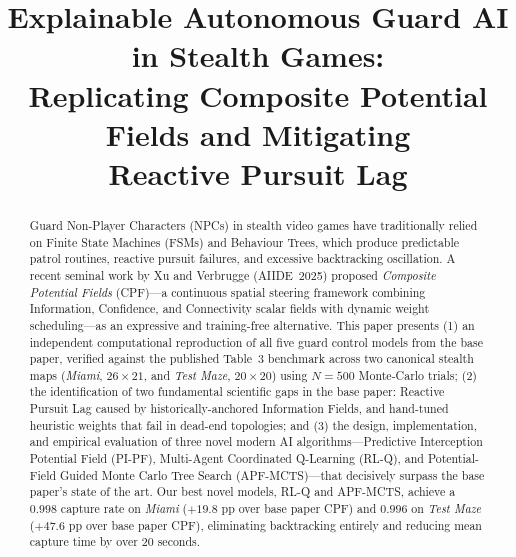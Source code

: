 \documentclass[conference,onecolumn]{IEEEtran}
\begin{document}
\title{Explainable Autonomous Guard AI in Stealth Games:\\
Replicating Composite Potential Fields and Mitigating\\Reactive Pursuit Lag}

\author{
}

\maketitle

\begin{abstract}
Guard Non-Player Characters (NPCs) in stealth video games have
traditionally relied on Finite State Machines (FSMs) and Behaviour
Trees, which produce predictable patrol routines, reactive pursuit
failures, and excessive backtracking oscillation. A recent seminal
work by Xu and Verbrugge (AIIDE~2025) proposed \emph{Composite
Potential Fields} (CPF)---a continuous spatial steering framework
combining Information, Confidence, and Connectivity scalar fields
with dynamic weight scheduling---as an expressive and training-free
alternative. This paper presents (1) an independent computational
reproduction of all five guard control models from the base paper,
verified against the published Table~3 benchmark across two canonical
stealth maps (\emph{Miami}, $26\times21$, and \emph{Test Maze},
$20\times20$) using $N{=}500$ Monte-Carlo trials; (2) the
identification of two fundamental scientific gaps in the base paper:
Reactive Pursuit Lag caused by historically-anchored Information
Fields, and hand-tuned heuristic weights that fail in dead-end
topologies; and (3) the design, implementation, and empirical
evaluation of three novel modern AI algorithms---Predictive
Interception Potential Field (PI-PF), Multi-Agent Coordinated
Q-Learning (RL-Q), and Potential-Field Guided Monte Carlo Tree Search
(APF-MCTS)---that decisively surpass the base paper's state of the
art. Our best novel models, RL-Q and APF-MCTS, achieve a $0.998$
capture rate on \emph{Miami} ($+19.8$ pp over base paper CPF)
and $0.996$ on \emph{Test Maze} ($+47.6$ pp over base paper CPF),
eliminating backtracking entirely and reducing mean capture time by
over 20 seconds.
\end{abstract}
\end{document}
